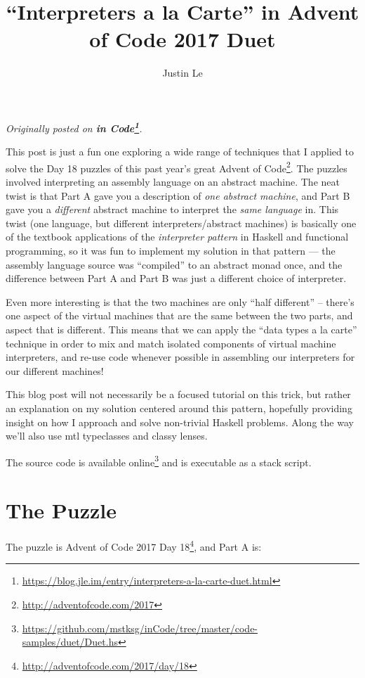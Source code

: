 \documentclass[]{article}
\title{``Interpreters a la Carte'' in Advent of Code 2017 Duet}
\author{Justin Le}
\renewcommand{\href}[2]{#2\footnote{\url{#1}}}
\begin{document}
\maketitle

\emph{Originally posted on
\textbf{\href{https://blog.jle.im/entry/interpreters-a-la-carte-duet.html}{in
Code}}.}

This post is just a fun one exploring a wide range of techniques that I applied
to solve the Day 18 puzzles of this past year's great
\href{http://adventofcode.com/2017}{Advent of Code}. The puzzles involved
interpreting an assembly language on an abstract machine. The neat twist is that
Part A gave you a description of \emph{one abstract machine}, and Part B gave
you a \emph{different} abstract machine to interpret the \emph{same language}
in. This twist (one language, but different interpreters/abstract machines) is
basically one of the textbook applications of the \emph{interpreter pattern} in
Haskell and functional programming, so it was fun to implement my solution in
that pattern --- the assembly language source was ``compiled'' to an abstract
monad once, and the difference between Part A and Part B was just a different
choice of interpreter.

Even more interesting is that the two machines are only ``half different'' --
there's one aspect of the virtual machines that are the same between the two
parts, and aspect that is different. This means that we can apply the ``data
types a la carte'' technique in order to mix and match isolated components of
virtual machine interpreters, and re-use code whenever possible in assembling
our interpreters for our different machines!

This blog post will not necessarily be a focused tutorial on this trick, but
rather an explanation on my solution centered around this pattern, hopefully
providing insight on how I approach and solve non-trivial Haskell problems.
Along the way we'll also use mtl typeclasses and classy lenses.

The source code is
\href{https://github.com/mstksg/inCode/tree/master/code-samples/duet/Duet.hs}{available
online} and is executable as a stack script.

\hypertarget{the-puzzle}{%
\section{The Puzzle}\label{the-puzzle}}

The puzzle is \href{http://adventofcode.com/2017/day/18}{Advent of Code 2017 Day
18}, and Part A is:
\end{document}

